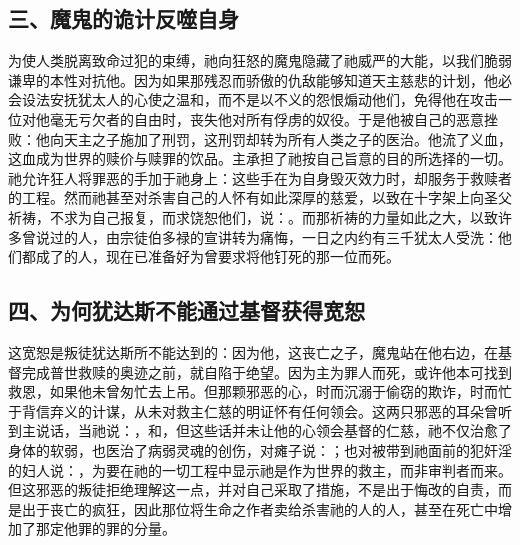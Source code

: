 
\subsection{三、魔鬼的诡计反噬自身}

为使人类脱离致命过犯的束缚，祂向狂怒的魔鬼隐藏了祂威严的大能，以我们脆弱谦卑的本性对抗他。因为如果那残忍而骄傲的仇敌能够知道天主慈悲的计划，他必会设法安抚犹太人的心使之温和，而不是以不义的怨恨煽动他们，免得他在攻击一位对他毫无亏欠者的自由时，丧失他对所有俘虏的奴役。于是他被自己的恶意挫败：他向天主之子施加了刑罚，这刑罚却转为所有人类之子的医治。他流了义血，这血成为世界的赎价与赎罪的饮品。主承担了祂按自己旨意的目的所选择的一切。祂允许狂人将罪恶的手加于祂身上：这些手在为自身毁灭效力时，却服务于救赎者的工程。然而祂甚至对杀害自己的人怀有如此深厚的慈爱，以致在十字架上向圣父祈祷，不求为自己报复，而求饶恕他们，说：。而那祈祷的力量如此之大，以致许多曾说过的人，由宗徒伯多禄的宣讲转为痛悔，一日之内约有三千犹太人受洗：他们都成了的人，现在已准备好为曾要求将他钉死的那一位而死。\par


\subsection{四、为何犹达斯不能通过基督获得宽恕}

这宽恕是叛徒犹达斯所不能达到的：因为他，这丧亡之子，魔鬼站在他右边，在基督完成普世救赎的奥迹之前，就自陷于绝望。因为主为罪人而死，或许他本可找到救恩，如果他未曾匆忙去上吊。但那颗邪恶的心，时而沉溺于偷窃的欺诈，时而忙于背信弃义的计谋，从未对救主仁慈的明证怀有任何领会。这两只邪恶的耳朵曾听到主说话，当祂说：，和，但这些话并未让他的心领会基督的仁慈，祂不仅治愈了身体的软弱，也医治了病弱灵魂的创伤，对瘫子说：；也对被带到祂面前的犯奸淫的妇人说：，为要在祂的一切工程中显示祂是作为世界的救主，而非审判者而来。但这邪恶的叛徒拒绝理解这一点，并对自己采取了措施，不是出于悔改的自责，而是出于丧亡的疯狂，因此那位将生命之作者卖给杀害祂的人的人，甚至在死亡中增加了那定他罪的罪的分量。\par

